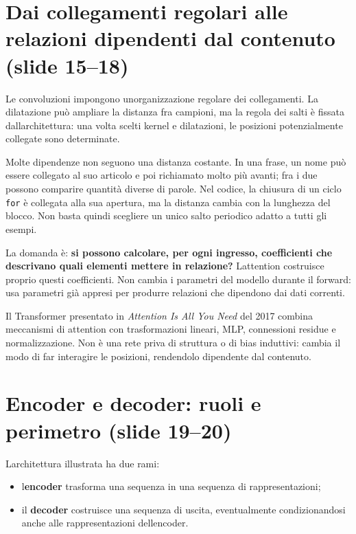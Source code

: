 \documentclass[11pt,a4paper,oneside,openany]{book}
\providecommand{\tightlist}{\setlength{\itemsep}{0pt}\setlength{\parskip}{0pt}}
\begin{document}
\section{Dai collegamenti regolari alle relazioni dipendenti dal contenuto (slide 15--18)}\label{f04-r266}

Le convoluzioni impongono un\textquotesingle organizzazione regolare dei collegamenti. La dilatazione può ampliare la distanza fra campioni, ma la regola dei salti è fissata dall\textquotesingle architettura: una volta scelti kernel e dilatazioni, le posizioni potenzialmente collegate sono determinate.

Molte dipendenze non seguono una distanza costante. In una frase, un nome può essere collegato al suo articolo e poi richiamato molto più avanti; fra i due possono comparire quantità diverse di parole. Nel codice, la chiusura di un ciclo \texttt{for} è collegata alla sua apertura, ma la distanza cambia con la lunghezza del blocco. Non basta quindi scegliere un unico salto periodico adatto a tutti gli esempi.

La domanda è: \textbf{si possono calcolare, per ogni ingresso, coefficienti che descrivano quali elementi mettere in relazione?} L\textquotesingle attention costruisce proprio questi coefficienti. Non cambia i parametri del modello durante il forward: usa parametri già appresi per produrre relazioni che dipendono dai dati correnti.

Il Transformer presentato in \emph{Attention Is All You Need} del 2017 combina meccanismi di attention con trasformazioni lineari, MLP, connessioni residue e normalizzazione. Non è una rete priva di struttura o di bias induttivi: cambia il modo di far interagire le posizioni, rendendolo dipendente dal contenuto.

\section{Encoder e decoder: ruoli e perimetro (slide 19--20)}\label{f04-r276}

L\textquotesingle architettura illustrata ha due rami:

\begin{itemize}
\tightlist
\item
  l\textquotesingle{}\textbf{encoder} trasforma una sequenza in una sequenza di rappresentazioni;
\item
  il \textbf{decoder} costruisce una sequenza di uscita, eventualmente condizionandosi anche alle rappresentazioni dell\textquotesingle encoder.
\end{itemize}
\end{document}
